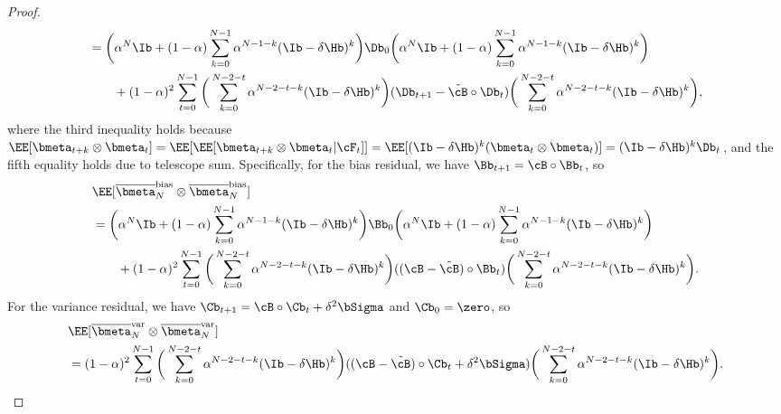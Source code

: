 \documentclass[11pt]{article}
\newcommand{\obmeta}{\overline{\bmeta}}
\begin{document}
\begin{proof}
\begin{align*}
&=\bigg(\alpha^N\Ib+(1-\alpha)\sum_{k=0}^{N-1}\alpha^{N-1-k}(\Ib-\delta\Hb)^k\bigg)\Db_0\bigg(\alpha^N\Ib+(1-\alpha)\sum_{k=0}^{N-1}\alpha^{N-1-k}(\Ib-\delta\Hb)^k\bigg)\\
&\qquad+(1-\alpha)^2\sum_{t=0}^{N-1}\bigg(\sum_{k=0}^{N-2-t}\alpha^{N-2-t-k}(\Ib-\delta\Hb)^k\bigg)(\Db_{t+1}-\tilde\cB\circ\Db_t)\bigg(\sum_{k=0}^{N-2-t}\alpha^{N-2-t-k}(\Ib-\delta\Hb)^k\bigg),
\end{align*}
where the third inequality holds because $\EE[\bmeta_{t+k}\otimes\bmeta_t]=\EE[\EE[\bmeta_{t+k}\otimes\bmeta_t|\cF_t]]=\EE[(\Ib-\delta\Hb)^k(\bmeta_t\otimes\bmeta_t)]=(\Ib-\delta\Hb)^k\Db_t$, and the fifth equality holds due to telescope sum. Specifically, for the bias residual, we have $\Bb_{t+1}=\cB\circ\Bb_t$, so
\begin{align*}
&\EE[\obmeta_N^{\mathrm{bias}}\otimes\obmeta_N^{\mathrm{bias}}]\\
&=\bigg(\alpha^N\Ib+(1-\alpha)\sum_{k=0}^{N-1}\alpha^{N-1-k}(\Ib-\delta\Hb)^k\bigg)\Bb_0\bigg(\alpha^N\Ib+(1-\alpha)\sum_{k=0}^{N-1}\alpha^{N-1-k}(\Ib-\delta\Hb)^k\bigg)\\
&\qquad+(1-\alpha)^2\sum_{t=0}^{N-1}\bigg(\sum_{k=0}^{N-2-t}\alpha^{N-2-t-k}(\Ib-\delta\Hb)^k\bigg)((\cB-\tilde\cB)\circ\Bb_t)\bigg(\sum_{k=0}^{N-2-t}\alpha^{N-2-t-k}(\Ib-\delta\Hb)^k\bigg).
\end{align*}
For the variance residual, we have $\Cb_{t+1}=\cB\circ\Cb_t+\delta^2\bSigma$ and $\Cb_0=\zero$, so
\begin{align*}
&\EE[\obmeta_N^{\mathrm{var}}\otimes\obmeta_N^{\mathrm{var}}]\\
&=(1-\alpha)^2\sum_{t=0}^{N-1}\bigg(\sum_{k=0}^{N-2-t}\alpha^{N-2-t-k}(\Ib-\delta\Hb)^k\bigg)((\cB-\tilde\cB)\circ\Cb_t+\delta^2\bSigma)\bigg(\sum_{k=0}^{N-2-t}\alpha^{N-2-t-k}(\Ib-\delta\Hb)^k\bigg).
\end{align*}
\end{proof}




\end{document}
